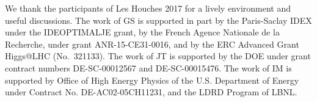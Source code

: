\documentclass[11pt,letterpaper]{article}
\begin{document}
\begin{acknowledgments}

We thank the participants of Les Houches 2017 for a lively environment and useful discussions. The work of GS is supported in part by the Paris-Saclay IDEX under the
IDEOPTIMALJE grant, by the French Agence Nationale de la Recherche,
under grant ANR-15-CE31-0016, and by the ERC Advanced Grant Higgs@LHC
(No.\ 321133).
%
The work of JT is supported by the DOE under grant contract numbers DE-SC-00012567 and DE-SC-00015476.
%
The work of IM is supported by Office of High Energy Physics of the U.S. Department of Energy under Contract No. DE-AC02-05CH11231, and the LDRD Program of LBNL.


\end{acknowledgments}







%
%
%
%
%
%

%
%
%
%
%
%
%
%
%
\end{document}
